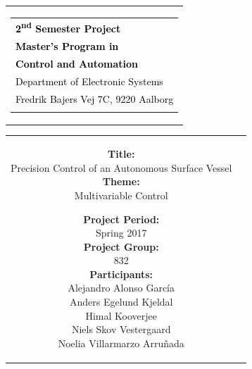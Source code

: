 % 
\begin{nopagebreak}
{\samepage 

\begin{tabular}{r}
\parbox{\textwidth}{  
\hfill \hspace{2cm} \parbox{8cm}{\begin{tabular}{l} %
{\small \textbf{\textcolor{black}{\colorbox{white}{2\textsuperscript{nd} Semester Project}}}}\\
{\small \textbf{\textcolor{black}{Master's Program in}}}\\ 
{\small \textbf{\textcolor{black}{Control and Automation}}}\\ 
{\small \textcolor{black}{Department of Electronic Systems}}\\
{\small \textcolor{black}{Fredrik Bajers Vej 7C, 9220 Aalborg}} \\
 \\
\end{tabular}}}
\end{tabular}

\begin{tabular}{cc}
\parbox{7cm}{

\textbf{Title:} \\
Precision Control of an Autonomous Surface Vessel \\

\textbf{Theme:} \\
\small{Multivariable Control
\\
}

\parbox{8cm}{

\textbf{Project Period:}\\
Spring 2017\\
   
\textbf{Project Group:}\\
832\\ %
  
\textbf{Participants:}\\
Alejandro Alonso García\\
Anders Egelund Kjeldal\\
Himal Kooverjee  \\
Niels Skov Vestergaard\\
Noelia Villarmarzo Arruñada\\

}}
\end{tabular}}
\end{nopagebreak}
